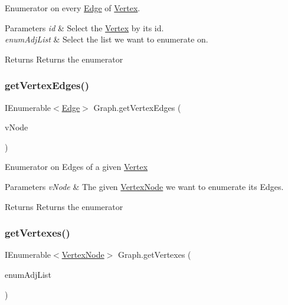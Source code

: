 Enumerator on every \hyperlink{classEdge}{Edge} of \hyperlink{structVertex}{Vertex}. 


\begin{DoxyParams}{Parameters}
{\em id} & Select the \hyperlink{structVertex}{Vertex} by its id.\\
\hline
{\em enum\+Adj\+List} & Select the list we want to enumerate on.\\
\hline
\end{DoxyParams}
\begin{DoxyReturn}{Returns}
Returns the enumerator
\end{DoxyReturn}
\mbox{\label{classGraph_a6b9f1276ad4846478a91e1969e75ba6f}} 
\subsubsection{\texorpdfstring{get\+Vertex\+Edges()}{getVertexEdges()}\hspace{0.1cm}{\footnotesize\ttfamily [2/2]}}
{\footnotesize\ttfamily I\+Enumerable$<$\hyperlink{classEdge}{Edge}$>$ Graph.\+get\+Vertex\+Edges (\begin{DoxyParamCaption}\item[{\hyperlink{classVertexNode}{Vertex\+Node}}]{v\+Node }\end{DoxyParamCaption})\hspace{0.3cm}{\ttfamily [inline]}}



Enumerator on Edges of a given \hyperlink{structVertex}{Vertex} 


\begin{DoxyParams}{Parameters}
{\em v\+Node} & The given \hyperlink{classVertexNode}{Vertex\+Node} we want to enumerate its Edges.\\
\hline
\end{DoxyParams}
\begin{DoxyReturn}{Returns}
Returns the enumerator
\end{DoxyReturn}
\mbox{\label{classGraph_a9bb1945939e97eb4fe194f1fd2867154}} 
\subsubsection{\texorpdfstring{get\+Vertexes()}{getVertexes()}}
{\footnotesize\ttfamily I\+Enumerable$<$\hyperlink{classVertexNode}{Vertex\+Node}$>$ Graph.\+get\+Vertexes (\begin{DoxyParamCaption}\item[{int}]{enum\+Adj\+List }\end{DoxyParamCaption})\hspace{0.3cm}{\ttfamily [inline]}}



